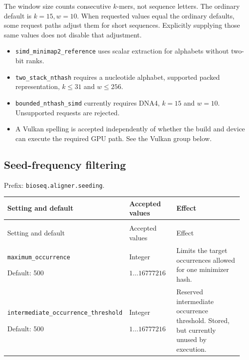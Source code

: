 The window size counts consecutive $k$-mers, not sequence letters. The ordinary
default is $k=15,w=10$. When requested values equal the ordinary
defaults, some request paths adjust them for short sequences. Explicitly
supplying those same values does not disable that adjustment.
\begin{itemize}
  \item \texttt{simd\_minimap2\_reference} uses scalar extraction for alphabets
    without two-bit ranks.
  \item \texttt{two\_stack\_nthash} requires a nucleotide alphabet, supported
    packed representation, $k\leq31$ and $w\leq256$.
  \item \texttt{bounded\_nthash\_simd} currently requires DNA4, $k=15$ and
    $w=10$. Unsupported requests are rejected.
  \item A Vulkan spelling is accepted independently of whether the build and
    device can execute the required GPU path. See the Vulkan group below.
\end{itemize}

\subsection{Seed-frequency filtering}

Prefix: \nolinkurl{bioseq.aligner.seeding}.

\begingroup
\small
\setlength{\tabcolsep}{4pt}
\renewcommand{\arraystretch}{1.16}
\begin{longtable}{@{}>{\raggedright\arraybackslash}p{0.34\linewidth}>{\raggedright\arraybackslash}p{0.22\linewidth}>{\raggedright\arraybackslash}p{0.40\linewidth}@{}}
\toprule
Setting and default & Accepted values & Effect \\
\midrule
\endfirsthead
\multicolumn{3}{@{}l}{Prefix: \nolinkurl{bioseq.aligner.seeding} (continued)} \\
\toprule
Setting and default & Accepted values & Effect \\
\midrule
\endhead
\bottomrule
\endfoot
\nolinkurl{maximum_occurrence}\par Default: 500 & Integer\par $1\ldots 16777216$ & Limits the target occurrences allowed for one minimizer hash. \\[4pt]
\nolinkurl{intermediate_occurrence_threshold}\par Default: 500 & Integer\par $1\ldots 16777216$ & Reserved intermediate occurrence threshold. Stored, but currently unused by execution. \\[4pt]
\end{longtable}
\endgroup

